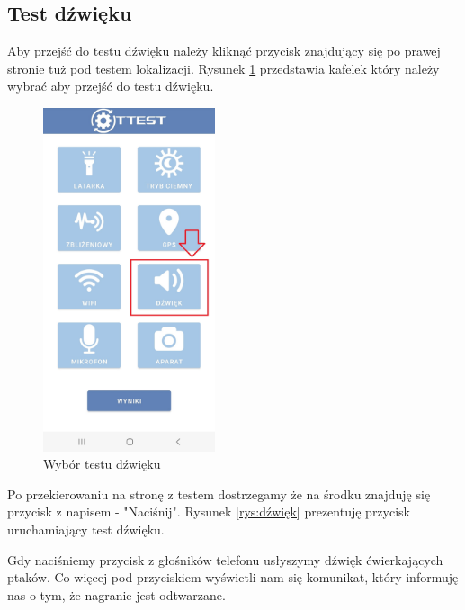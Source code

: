 \newpage


\subsection{Test dźwięku}

\hspace{0.60cm}Aby przejść do testu dźwięku należy kliknąć przycisk znajdujący się po prawej stronie tuż pod testem lokalizacji. Rysunek \ref{rys:menu5} przedstawia kafelek który należy wybrać aby przejść do testu dźwięku.

\begin{figure}[!hbt]
	\begin{center}
		\includegraphics[angle=360, width=0.45\textwidth]{rys/punkt6/menu5}
		\caption{Wybór testu dźwięku}
		\label{rys:menu5}
	\end{center}
\end{figure}

Po przekierowaniu na stronę z testem dostrzegamy że na środku znajduję się przycisk z napisem - "Naciśnij". Rysunek \ref{rys:dźwięk} prezentuję przycisk uruchamiający test dźwięku.

Gdy naciśniemy przycisk z głośników telefonu usłyszymy dźwięk ćwierkających ptaków. Co więcej pod przyciskiem wyświetli nam się komunikat, który informuję nas o tym, że nagranie jest odtwarzane. 

\newpage

